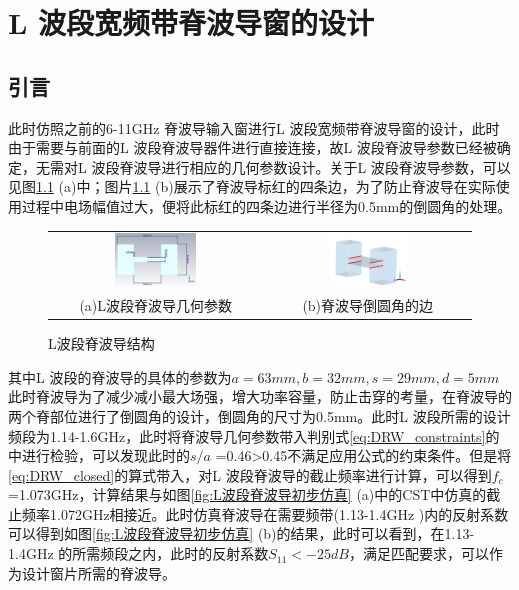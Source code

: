 \documentclass[master]{thesis-uestc}
\begin{document}
\chapter{L 波段宽频带脊波导窗的设计}
\section{引言}
此时仿照之前的6-11GHz 脊波导输入窗进行L 波段宽频带脊波导窗的设计，此时由于需要与前面的L 波段脊波导器件进行直接连接，故L 波段脊波导参数已经被确定，无需对L 波段脊波导进行相应的几何参数设计。关于L 波段脊波导参数，可以见图\ref{fig:L波段脊波导结构} (a)中；图片\ref{fig:L波段脊波导结构} (b)展示了脊波导标红的四条边，为了防止脊波导在实际使用过程中电场幅值过大，便将此标红的四条边进行半径为0.5mm的倒圆角的处理。

\begin{figure}[!htb]
    \small
    \centering
    \begin{tabular}{@{\ }c@{\ }c}
        \includegraphics[width=0.4\textwidth]{pic/chapter4/L波段脊波导几何参数.png} & 
        \hspace{5pt}
        \includegraphics[width=0.4\textwidth]{pic/chapter4/脊波导倒圆角边.png}     \\
        \mbox{\small (a)L波段脊波导几何参数}                                                                               & 
        \mbox{\small (b)脊波导倒圆角的边}                                                                                  \\
    \end{tabular}
    \caption{L波段脊波导结构}
    \label{fig:L波段脊波导结构}
\end{figure}

其中L 波段的脊波导的具体的参数为$a=63mm, b=32mm, s=29mm, d=5mm$此时脊波导为了减少减小最大场强，增大功率容量，防止击穿的考量，在脊波导的两个脊部位进行了倒圆角的设计，倒圆角的尺寸为0.5mm。此时L 波段所需的设计频段为1.14-1.6GHz，此时将脊波导几何参数带入判别式\ref{eq:DRW_constraints}的中进行检验，可以发现此时的$s / a$ =0.46>0.45不满足应用公式的约束条件。但是将\ref{eq:DRW_closed}的算式带入，对L 波段脊波导的截止频率进行计算，可以得到$f_c$=1.073GHz，计算结果与如图\ref{fig:L波段脊波导初步仿真} (a)中的CST中仿真的截止频率1.072GHz相接近。此时仿真脊波导在需要频带(1.13-1.4GHz )内的反射系数可以得到如图\ref{fig:L波段脊波导初步仿真} (b)的结果，此时可以看到，在1.13-1.4GHz 的所需频段之内，此时的反射系数$S_{11}<-25dB$，满足匹配要求，可以作为设计窗片所需的脊波导。
\end{document}
